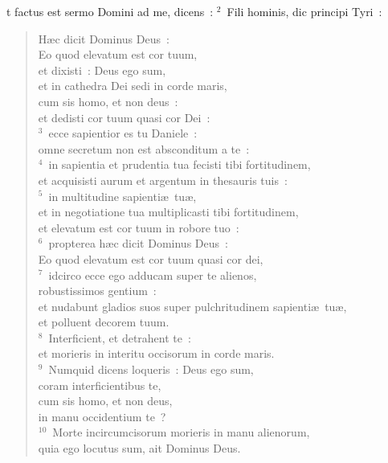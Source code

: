 \bchapter
{}t factus est sermo Domini ad me, dicens~:
${}^{2}$~Fili hominis, dic principi Tyri~: \begin{verse}H\ae c dicit Dominus Deus~:\\ Eo quod elevatum est cor tuum,\\ et dixisti~: Deus ego sum,\\ et in cathedra Dei sedi in corde maris,\\ cum sis homo, et non deus~:\\ et dedisti cor tuum quasi cor Dei~:\\
${}^{3}$~ecce sapientior es tu Daniele~:\\ omne secretum non est absconditum a te~:\\
${}^{4}$~in sapientia et prudentia tua fecisti tibi fortitudinem,\\ et acquisisti aurum et argentum in thesauris tuis~:\\
${}^{5}$~in multitudine sapienti\ae\ tu\ae ,\\ et in negotiatione tua multiplicasti tibi fortitudinem,\\ et elevatum est cor tuum in robore tuo~:\\
${}^{6}$~propterea h\ae c dicit Dominus Deus~:\\ Eo quod elevatum est cor tuum quasi cor dei,\\
${}^{7}$~idcirco ecce ego adducam super te alienos,\\ robustissimos gentium~:\\ et nudabunt gladios suos super pulchritudinem sapienti\ae\ tu\ae ,\\ et polluent decorem tuum.\\
${}^{8}$~Interficient, et detrahent te~:\\ et morieris in interitu occisorum in corde maris.\\
${}^{9}$~Numquid dicens loqueris~: Deus ego sum,\\ coram interficientibus te,\\ cum sis homo, et non deus,\\ in manu occidentium te~?\\
${}^{10}$~Morte incircumcisorum morieris in manu alienorum,\\ quia ego locutus sum, ait Dominus Deus.\end{verse}



